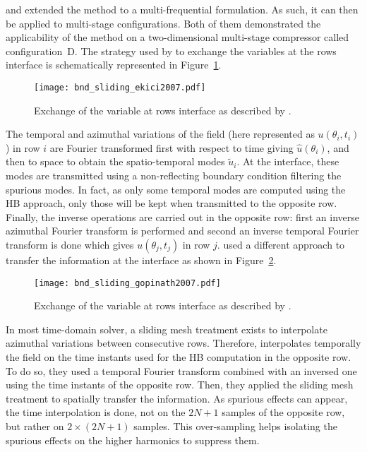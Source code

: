 \citet{Ekici2007} and \citet{Gopinath2007}
extended the method to a multi-frequential formulation. 
As such, it can then be applied to multi-stage
configurations. Both of them demonstrated the applicability of
the method on
a two-dimensional multi-stage compressor called
configuration~D. 
The strategy used by \citet{Ekici2007} 
to exchange the variables at
the rows interface is schematically represented 
in Figure~\ref{fig:bnd_sliding_ekici2007}.
\begin{figure}[htp]
  \centering
  \texttt{[image: bnd\_sliding\_ekici2007.pdf]}
  \caption{Exchange of the variable at rows interface as described by \citet{Ekici2007}.}
  \label{fig:bnd_sliding_ekici2007}
\end{figure}
The temporal and azimuthal variations 
of the field (here represented as $u (\theta_i, t_i)$)
in row $i$ are Fourier transformed first with
respect to time giving $\widehat{u} (\theta_i)$, and then
to space to obtain the spatio-temporal modes $\widetilde{u}_i$.
At the interface, these modes are transmitted using a non-reflecting
boundary condition filtering the spurious modes. In fact, as only some
temporal modes are computed using the HB approach, only
those will be kept when transmitted to the opposite row.
Finally, the inverse operations are carried out in
the opposite row: first an inverse
azimuthal Fourier transform is performed and second an inverse
temporal Fourier transform is done which gives $u (\theta_j, t_j)$
in row $j$.
\citet{Gopinath2007} used a different approach to transfer
the information at the interface as shown
in Figure~\ref{fig:bnd_sliding_gopinath2007}. 
\begin{figure}[htp]
  \centering
  \texttt{[image: bnd\_sliding\_gopinath2007.pdf]}
  \caption{Exchange of the variable at rows interface as described by \citet{Gopinath2007}.}
  \label{fig:bnd_sliding_gopinath2007}
\end{figure}
In most time-domain solver,
a sliding mesh treatment exists to interpolate azimuthal variations
between consecutive rows. Therefore, \citet{Gopinath2007}
interpolates temporally the field on the time instants used for
the HB computation in
the opposite row. To do so, they used a temporal Fourier
transform combined with an inversed one using the time instants
of the opposite row.
Then, they applied the sliding mesh treatment
to spatially transfer the information. As spurious effects
can appear, the time interpolation is done, not on the $2N+1$ samples
of the opposite row, but rather on $2 \times (2N+1)$ samples. This over-sampling
helps isolating the spurious effects on the higher harmonics to suppress them.



